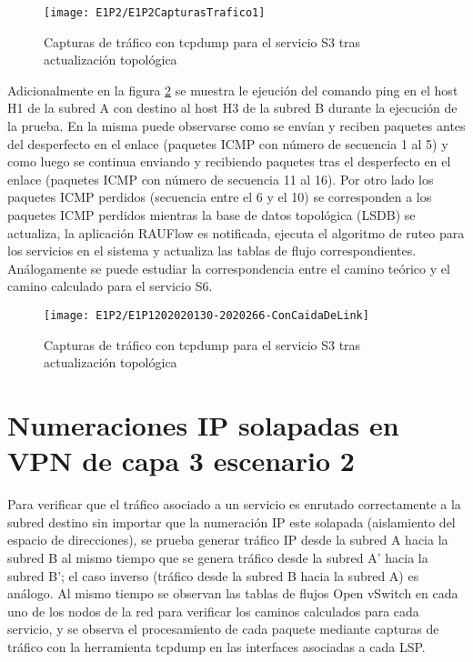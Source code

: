 \newpage
\begin{figure}[ht!] 
\centering    
\texttt{[image: E1P2/E1P2CapturasTrafico1]}
\caption[Capturas de tr\'afico con tcpdump para el servicio S3 tras actualización topol\'ogica]{Capturas de tr\'afico con tcpdump para el servicio S3 tras actualización topol\'ogica}
\label{fig:LabE1P1CapsTraf3}
\end{figure}

Adicionalmente en la figura \ref{fig:LabE1P2CapHost} se muestra le ejeuci\'on del comando ping en el host H1 de la subred A con destino al host H3 de la subred B durante la ejecuci\'on de la prueba. En la misma puede observarse como se envían y reciben paquetes antes del desperfecto en el enlace (paquetes ICMP con n\'umero de secuencia 1 al 5) y como luego se continua enviando y recibiendo paquetes tras el desperfecto en el enlace (paquetes ICMP con n\'umero de secuencia 11 al 16). Por otro lado los paquetes ICMP perdidos (secuencia entre el 6 y el 10) se corresponden a los paquetes ICMP perdidos mientras la base de datos topol\'ogica (LSDB) se actualiza, la aplicaci\'on RAUFlow es notificada, ejecuta el algoritmo de ruteo para los servicios en el sistema y actualiza las tablas de flujo correspondientes.   \\

Análogamente se puede estudiar la correspondencia entre el camino te\'orico y el camino calculado para el servicio S6.\\

\begin{figure}[ht!] 
\centering    
\texttt{[image: E1P2/E1P1202020130-2020266-ConCaidaDeLink]}
\caption[Capturas de tr\'afico con tcpdump para el servicio S3 tras actualización topol\'ogica]{Capturas de tr\'afico con tcpdump para el servicio S3 tras actualización topol\'ogica}
\label{fig:LabE1P2CapHost}
\end{figure}

\section{Numeraciones IP solapadas en VPN de capa 3 escenario 2}
\label{appendix6.4}
Para verificar que el tr\'afico asociado a un servicio es enrutado correctamente a la subred destino sin importar que la numeración IP este solapada (aislamiento del espacio de direcciones), se prueba generar tr\'afico IP desde la subred A hacia la subred B al mismo tiempo que se genera tr\'afico desde la subred A' hacia la subred B'; el caso inverso (tr\'afico desde la subred B hacia la subred A) es an\'alogo. Al mismo tiempo se observan las tablas de flujos Open vSwitch en cada uno de los nodos de la red para verificar los caminos calculados para cada servicio, y se observa el procesamiento de cada paquete mediante capturas de tr\'afico con la herramienta tcpdump en las interfaces asociadas a cada LSP.\\

